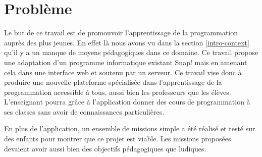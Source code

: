 \section{Problème}
\label{into-problem}
Le but de ce travail est de promouvoir l'apprentissage de la programmation auprès des plus jeunes. En effet là nous avons vu dans la section \ref{intro-context} qu'il y a un manque de moyens pédagogiques dans ce domaine. Ce travail propose une adaptation d'un programme informatique existant Snap! mais en amenant cela dans une interface web et soutenu par un serveur. Ce travail vise donc à produire une nouvelle plateforme spécialisée dans l'apprentissage de la programmation accessible à tous, aussi bien les professeurs que les élèves. L'enseignant pourra grâce à l'application donner des cours de programmation à ses classes sans avoir de connaissances particulières.

En plus de l'application, un ensemble de missions simple a été réalisé et testé sur des enfants pour montrer que ce projet est viable. Les missions proposées devaient avoir aussi bien des objectifs pédagogiques que ludiques.
